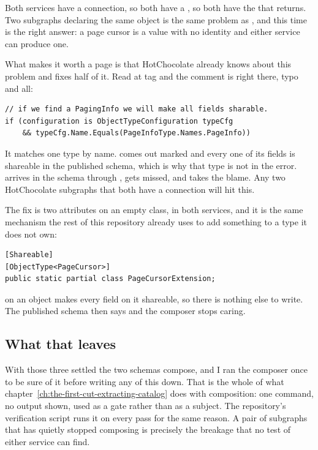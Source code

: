 Both services have a connection, so both have a , so both have
the  that  returns. Two subgraphs
declaring the same object is the same problem as , and this time
 is the right answer: a page cursor is a value with no identity
and either service can produce one.

What makes it worth a page is that HotChocolate already knows about this
problem and fixes half of it. Read  at tag
 and the comment is right there, typo and all:

\begin{verbatim}
// if we find a PagingInfo we will make all fields sharable.
if (configuration is ObjectTypeConfiguration typeCfg
    && typeCfg.Name.Equals(PageInfoType.Names.PageInfo))
\end{verbatim}

%
It matches one type by name.  comes out marked and every one of
its fields is shareable in the published schema, which is why that type is not
in the error.  arrives in the schema through ,
gets missed, and takes the blame. Any two HotChocolate subgraphs that both have
a connection will hit this.

The fix is two attributes on an empty class, in both services, and it is the
same mechanism the rest of this repository already uses to add something to a
type it does not own:

\begin{verbatim}
[Shareable]
[ObjectType<PageCursor>]
public static partial class PageCursorExtension;
\end{verbatim}

 on an object makes every field on it shareable, so there is
nothing else to write. The published schema then says
 and the composer stops caring.

\subsection*{What that leaves}

With those three settled the two schemas compose, and I ran the composer once to
be sure of it before writing any of this down. That is the whole of what
chapter~\ref{ch:the-first-cut-extracting-catalog} does with composition: one
command, no output shown, used as a gate rather than as a subject. The
repository's verification script runs it on every pass for the same reason. A
pair of subgraphs that has quietly stopped composing is precisely the breakage
that no test of either service can find.


